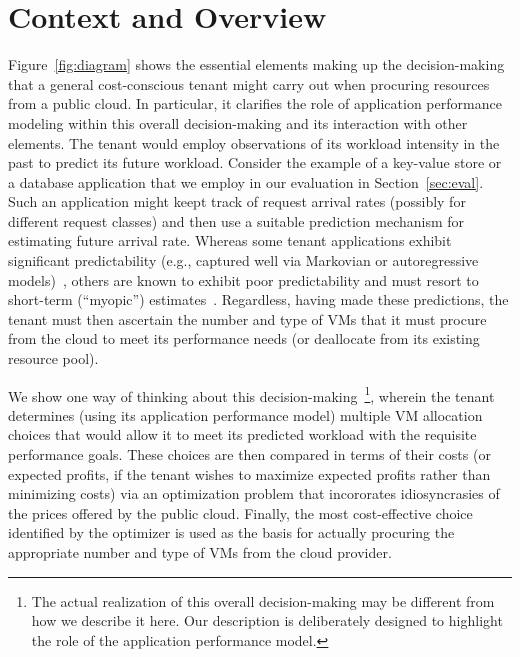 \section{Context and Overview}
\label{sec:back}
\vspace{10pt}

 

Figure~\ref{fig:diagram} shows the essential elements making up the decision-making that a general cost-conscious tenant might carry out when procuring resources from a public cloud. In particular, it clarifies the role of application performance modeling within this overall decision-making and its interaction with other elements. 
The tenant would employ observations of its workload intensity in the past to predict its future workload. Consider the example of a key-value store or a database application that we employ in our evaluation in Section~\ref{sec:eval}. Such an application might keept track of request arrival rates (possibly for different request classes) and then use a suitable prediction mechanism for estimating future arrival rate. Whereas some tenant applications exhibit significant predictability (e.g., captured well via Markovian or autoregressive models)~\cite{DBLP:conf/iwqos/ChandraGS03,Shen00predictivemodels,Squillante:1999:WTM:340242.340323,Arlitt:1997:IWS:268715.268720}, others are known to exhibit poor predictability and must resort to short-term (``myopic'') estimates~\cite{Crovella:1997:SWW:270856.270880,DBLP:conf/eenergy/WangNKUWCGB15,Jung:2002:FCD:511446.511485}. Regardless, having made these predictions, the tenant must then ascertain the number and type of VMs that it must procure from the cloud to meet its performance needs (or deallocate from its existing resource pool). 

We show one way of thinking about this decision-making~\footnote{The actual realization of this overall decision-making may be different from how we describe it here. Our description is deliberately designed to highlight the role of the application performance model.}, wherein the tenant determines (using its application performance model) multiple VM allocation choices that would allow it to meet its predicted workload with the requisite performance goals. These choices are then compared in terms of their costs (or expected profits, if the tenant wishes to maximize expected profits rather than minimizing costs) via an optimization problem that incororates idiosyncrasies of the prices offered by the public cloud. Finally, the most cost-effective choice identified by the optimizer is used as the basis for actually procuring the appropriate number and type of VMs from the cloud provider. 

